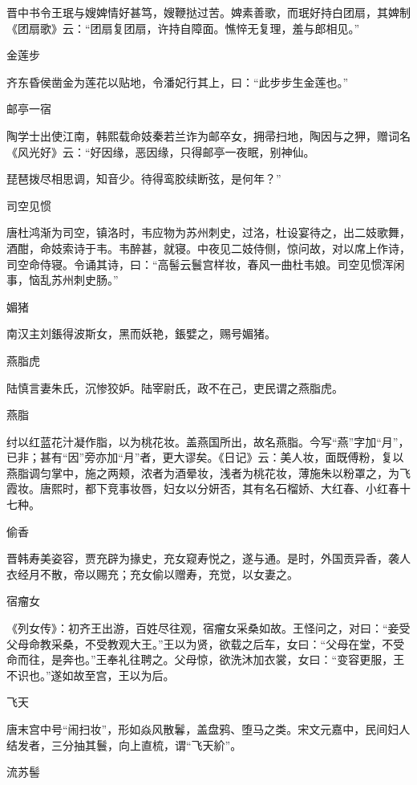\documentclass[a4paper,12pt,UTF8,twoside]{ctexbook}
\begin{document}
    晋中书令王珉与嫂婢情好甚笃，嫂鞭挞过苦。婢素善歌，而珉好持白团扇，其婢制《团扇歌》云：“团扇复团扇，许持自障面。憔悴无复理，羞与郎相见。”
    
    金莲步
    
    齐东昏侯凿金为莲花以贴地，令潘妃行其上，曰：“此步步生金莲也。”
    
    邮亭一宿
    
    陶学士出使江南，韩熙载命妓秦若兰诈为邮卒女，拥帚扫地，陶因与之狎，赠词名《风光好》云：“好因缘，恶因缘，只得邮亭一夜眠，别神仙。
    
    琵琶拨尽相思调，知音少。待得鸾胶续断弦，是何年？”
    
    司空见惯
    
    唐杜鸿渐为司空，镇洛时，韦应物为苏州刺史，过洛，杜设宴待之，出二妓歌舞，酒酣，命妓索诗于韦。韦醉甚，就寝。中夜见二妓侍侧，惊问故，对以席上作诗，司空命侍寝。令诵其诗，曰：“高髻云鬟宫样妆，春风一曲杜韦娘。司空见惯浑闲事，恼乱苏州刺史肠。”
    
    媚猪
    
    南汉主刘鋹得波斯女，黑而妖艳，鋹嬖之，赐号媚猪。
    
    燕脂虎
    
    陆慎言妻朱氏，沉惨狡妒。陆宰尉氏，政不在己，吏民谓之燕脂虎。
    
    燕脂
    
    纣以红蓝花汁凝作脂，以为桃花妆。盖燕国所出，故名燕脂。今写“燕”字加“月”，已非；甚有“因”旁亦加“月”者，更大谬矣。《日记》云：美人妆，面既傅粉，复以燕脂调匀掌中，施之两颊，浓者为酒晕妆，浅者为桃花妆，薄施朱以粉罩之，为飞霞妆。唐熙时，都下竞事妆唇，妇女以分妍否，其有名石榴娇、大红春、小红春十七种。
    
    偷香
    
    晋韩寿美姿容，贾充辟为掾史，充女窥寿悦之，遂与通。是时，外国贡异香，袭人衣经月不散，帝以赐充；充女偷以赠寿，充觉，以女妻之。
    
    宿瘤女
    
    《列女传》：初齐王出游，百姓尽往观，宿瘤女采桑如故。王怪问之，对曰：“妾受父母命教采桑，不受教观大王。”王以为贤，欲载之后车，女曰：“父母在堂，不受命而往，是奔也。”王奉礼往聘之。父母惊，欲洗沐加衣裳，女曰：“变容更服，王不识也。”遂如故至宫，王以为后。
    
    飞天
    
    唐末宫中号“闹扫妆”，形如焱风散鬊，盖盘鸦、堕马之类。宋文元嘉中，民间妇人结发者，三分抽其鬟，向上直梳，谓“飞天紒”。
    
    流苏髻
    
\end{document}
